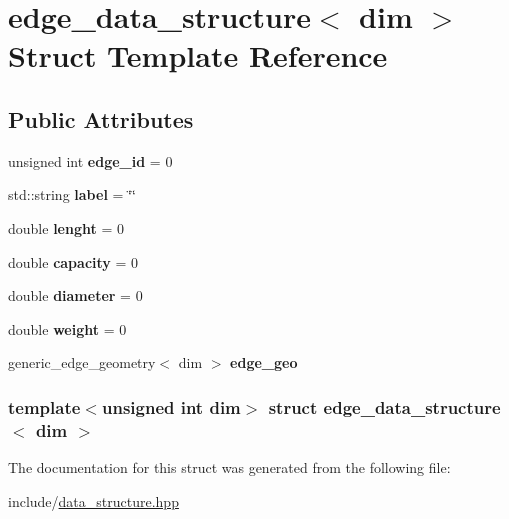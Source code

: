 \hypertarget{structedge__data__structure}{
\section{edge\_\-data\_\-structure$<$ dim $>$ Struct Template Reference}
\label{structedge__data__structure}
}
\subsection*{Public Attributes}
\begin{DoxyCompactItemize}
\item 
\hypertarget{structedge__data__structure_aec41c0f9780370b8650c7ee0f543f7ab}{
unsigned int {\bfseries edge\_\-id} = 0}
\label{structedge__data__structure_aec41c0f9780370b8650c7ee0f543f7ab}

\item 
\hypertarget{structedge__data__structure_a2c23e71c2fd29d1a400b916992668774}{
std::string {\bfseries label} = \char`\"{}\char`\"{}}
\label{structedge__data__structure_a2c23e71c2fd29d1a400b916992668774}

\item 
\hypertarget{structedge__data__structure_a6842d811177dd1603b5436a8e38e1457}{
double {\bfseries lenght} = 0}
\label{structedge__data__structure_a6842d811177dd1603b5436a8e38e1457}

\item 
\hypertarget{structedge__data__structure_af69d7d380e0e2b79f15c2b5af07e8afe}{
double {\bfseries capacity} = 0}
\label{structedge__data__structure_af69d7d380e0e2b79f15c2b5af07e8afe}

\item 
\hypertarget{structedge__data__structure_a2ff81a66e3636a6b1b323dfb04ce36e2}{
double {\bfseries diameter} = 0}
\label{structedge__data__structure_a2ff81a66e3636a6b1b323dfb04ce36e2}

\item 
\hypertarget{structedge__data__structure_a2dc5eb72ac308fddb9f4bd6510ff387c}{
double {\bfseries weight} = 0}
\label{structedge__data__structure_a2dc5eb72ac308fddb9f4bd6510ff387c}

\item 
\hypertarget{structedge__data__structure_a1d0b2d0bd57d916e472a7f3ec0d4d94e}{
generic\_\-edge\_\-geometry$<$ dim $>$ {\bfseries edge\_\-geo}}
\label{structedge__data__structure_a1d0b2d0bd57d916e472a7f3ec0d4d94e}

\end{DoxyCompactItemize}
\subsubsection*{template$<$unsigned int dim$>$ struct edge\_\-data\_\-structure$<$ dim $>$}



The documentation for this struct was generated from the following file:\begin{DoxyCompactItemize}
\item 
include/\hyperlink{data__structure_8hpp}{data\_\-structure.hpp}\end{DoxyCompactItemize}
